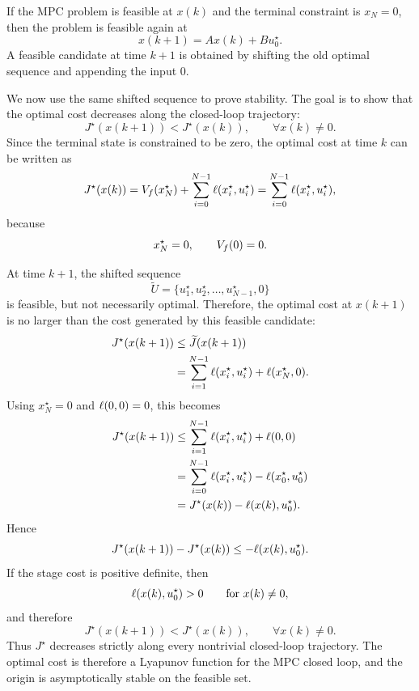\begin{theorembox}[Recursive feasibility for {\ensuremath{x_N=0}}]
If the MPC problem is feasible at \(x(k)\) and the terminal constraint is \(x_N=0\), then the
problem is feasible again at
\[
    x(k+1)=Ax(k)+Bu_0^\star.
\]
A feasible candidate at time \(k+1\) is obtained by shifting the old optimal sequence and
appending the input \(0\).
\end{theorembox}

We now use the same shifted sequence to prove stability. The goal is to show that the optimal
cost decreases along the closed-loop trajectory:
\[
    J^\star(x(k+1)) < J^\star(x(k)),
    \qquad
    \forall x(k)\neq 0.
\]
Since the terminal state is constrained to be zero, the optimal cost at time \(k\) can be written as
\[
    J^\star(x(k))
    =
    V_f(x_N^\star)
    +
    \sum_{i=0}^{N-1}\ell(x_i^\star,u_i^\star)
    =
    \sum_{i=0}^{N-1}\ell(x_i^\star,u_i^\star),
\]
because
\[
    x_N^\star=0,
    \qquad
    V_f(0)=0.
\]

At time \(k+1\), the shifted sequence
\[
    \widetilde{U}
    =
    \{u_1^\star,u_2^\star,\ldots,u_{N-1}^\star,0\}
\]
is feasible, but not necessarily optimal. Therefore, the optimal cost at \(x(k+1)\) is no larger
than the cost generated by this feasible candidate:
\[
\begin{aligned}
    J^\star(x(k+1))
    &\leq
    \widetilde{J}(x(k+1)) \\
    &=
    \sum_{i=1}^{N-1}\ell(x_i^\star,u_i^\star)
    +
    \ell(x_N^\star,0).
\end{aligned}
\]
Using \(x_N^\star=0\) and \(\ell(0,0)=0\), this becomes
\[
\begin{aligned}
    J^\star(x(k+1))
    &\leq
    \sum_{i=1}^{N-1}\ell(x_i^\star,u_i^\star)
    +
    \ell(0,0)\\
    &=
    \sum_{i=0}^{N-1}\ell(x_i^\star,u_i^\star)
    -
    \ell(x_0^\star,u_0^\star)\\
    &=
    J^\star(x(k))
    -
    \ell(x(k),u_0^\star).
\end{aligned}
\]
Hence
\[
    J^\star(x(k+1))-J^\star(x(k))
    \leq
    -\ell(x(k),u_0^\star).
\]
If the stage cost is positive definite, then
\[
    \ell(x(k),u_0^\star)>0
    \qquad
    \text{for } x(k)\neq 0,
\]
and therefore
\[
    J^\star(x(k+1))<J^\star(x(k)),
    \qquad
    \forall x(k)\neq 0.
\]
Thus \(J^\star\) decreases strictly along every nontrivial closed-loop trajectory. The optimal
cost is therefore a Lyapunov function for the MPC closed loop, and the origin is asymptotically
stable on the feasible set.

